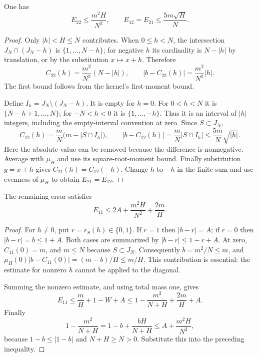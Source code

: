 \begin{lemma}
\leanok
\label{core:interval-errors}
One has
\[
 E_{22}\leq\frac{m^2H}{N^2},\qquad
 E_{12}=E_{21}\leq\frac{5m\sqrt H}{N}.
\]
\end{lemma}
\begin{proof}
Only $|h|<H\leq N$ contributes.  When $0\leq h<N$, the
intersection $J_N\cap(J_N-h)$ is $\{1,\ldots,N-h\}$; for
negative $h$ its cardinality is $N-|h|$ by translation, or by
the substitution $x\mapsto x+h$.  Therefore
\[
 C_{22}(h)=\frac{m^2}{N^2}(N-|h|),\qquad
 |b-C_{22}(h)|=\frac{m^2}{N^2}|h|.
\]
The first bound follows from the kernel's first-moment bound.

Define $I_h=J_N\setminus(J_N-h)$.  It is empty for $h=0$.
For $0<h<N$ it is $\{N-h+1,\ldots,N\}$; for $-N<h<0$
it is $\{1,\ldots,-h\}$.  Thus it is an interval of $|h|$
integers, including the empty-interval convention at zero.
Since $S\subset J_N$,
\[
 C_{12}(h)=\frac mN\bigl(m-|S\cap I_h|\bigr),\qquad
 |b-C_{12}(h)|=\frac mN|S\cap I_h|
                        \leq\frac{5m}{N}\sqrt{|h|}.
\]
Here the absolute value can be removed because the difference is
nonnegative.  Average with $\mu_H$ and use its square-root-moment
bound.  Finally substitution $y=x+h$ gives
$C_{21}(h)=C_{12}(-h)$.  Change $h$ to $-h$ in the finite sum
and use evenness of $\mu_H$ to obtain $E_{21}=E_{12}$.
\end{proof}

\begin{lemma}
\leanok
\label{core:self-error}
The remaining error satisfies
\[
 E_{11}\leq 2A+\frac{m^2H}{N^2}+\frac{2m}{H}.
\]
\end{lemma}
\begin{proof}
For $h\ne0$, put $r=r_S(h)\in\{0,1\}$.  If $r=1$ then
$|b-r|=A$; if $r=0$ then $|b-r|=b\leq1+A$.
Both cases are summarized by $|b-r|\leq1-r+A$.
At zero, $C_{11}(0)=m$, and $m\leq N$ because $S\subset J_N$.
Consequently $b=m^2/N\leq m$, and
$\mu_H(0)|b-C_{11}(0)|=(m-b)/H\leq m/H$.
This contribution is essential: the estimate for nonzero $h$
cannot be applied to the diagonal.

Summing the nonzero estimate, and using total mass one, gives
\[
 E_{11}\leq\frac mH+1-W+A
 \leq 1-\frac{m^2}{N+H}+\frac{2m}{H}+A.
\]
Finally
\[
 1-\frac{m^2}{N+H}
   =1-b+\frac{bH}{N+H}
   \leq A+\frac{m^2H}{N^2},
\]
because $1-b\leq|1-b|$ and $N+H\geq N>0$.
Substitute this into the preceding inequality.
\end{proof}

